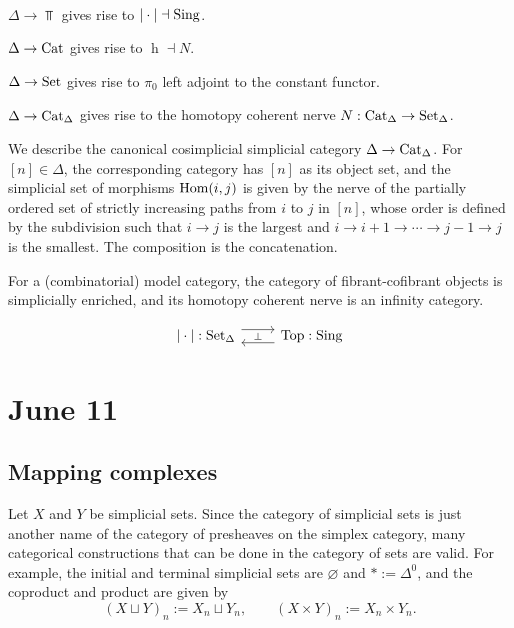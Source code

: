 \documentclass{../../../small}
\begin{document}
\begin{example}\,
\begin{parts}
\item $\Delta\to\Top$ gives rise to $|\cdot|\dashv\operatorname{Sing}$.
\item $\Delta\to\operatorname{Cat}$ gives rise to $\operatorname{h}\dashv N$.
\item $\Delta\to\operatorname{Set}$ gives rise to $\pi_0$ left adjoint to the constant functor.
\item $\Delta\to\operatorname{Cat}_\Delta$ gives rise to the homotopy coherent nerve $N:\operatorname{Cat}_\Delta\to\operatorname{Set}_\Delta$.

We describe the canonical cosimplicial simplicial category $\Delta\to\operatorname{Cat}_\Delta$.
For $[n]\in\Delta$, the corresponding category has $[n]$ as its object set, and the simplicial set of morphisms $\operatorname{Hom}(i,j)$ is given by the nerve of the partially ordered set of strictly increasing paths from $i$ to $j$ in $[n]$, whose order is defined by the subdivision such that $i\to j$ is the largest and $i\to i+1\to\cdots\to j-1\to j$ is the smallest.
The composition is the concatenation.

For a (combinatorial) model category, the category of fibrant-cofibrant objects is simplicially enriched, and its homotopy coherent nerve is an infinity category.
\end{parts}
\end{example}



\[\begin{tikzcd}
{|\cdot|}:\Set_\Delta
\rar[shift left=2]\rar[phantom,"\scriptstyle\perp"]&\lar[shift left=2]
\Top:\Sing
\end{tikzcd}\]




\newpage
\section{June 11}


\subsection{Mapping complexes}


\begin{definition*}
Let $X$ and $Y$ be simplicial sets.
Since the category of simplicial sets is just another name of the category of presheaves on the simplex category, many categorical constructions that can be done in the category of sets are valid.
For example, the initial and terminal simplicial sets are $\varnothing$ and $*:=\Delta^0$, and the coproduct and product are given by
\[(X\sqcup Y)_n:=X_n\sqcup Y_n,\qquad(X\times Y)_n:=X_n\times Y_n.\]
\end{definition*}
\end{document}
